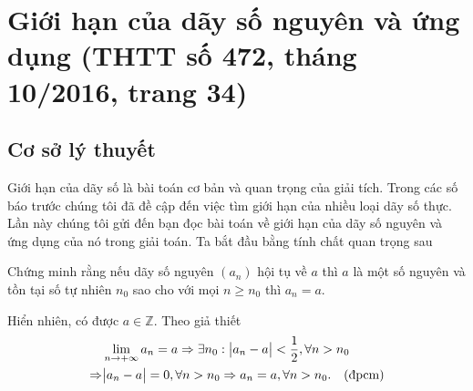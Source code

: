 \section{Giới hạn của dãy số nguyên và ứng dụng (THTT số 472, tháng 10/2016, trang 34)}
\begin{center}
	\textbf{\color{violet}{Kiều Đình Minh - Tạ Anh Dũng \\
			(GV THPT Chuyên Hùng Vương, Phú Thọ)}}
\end{center}
\subsection{Cơ sở lý thuyết}
\noindent Giới hạn của dãy số là bài toán cơ bản và quan trọng của giải tích. Trong các số báo trước chúng tôi đã đề cập đến việc tìm giới hạn của nhiều loại dãy số thực. Lần này chúng tôi gửi đến bạn đọc bài toán về giới hạn của dãy số nguyên và ứng dụng của nó trong giải toán. Ta bắt đầu bằng tính chất quan trọng sau
\begin{dl}
	Chứng minh rằng nếu dãy số nguyên $(a_n)$ hội tụ về $a$ thì $a$ là một số nguyên và tồn tại số tự nhiên $n_0$ sao cho với mọi $n \geq n_0$ thì  $a_n=a$.
\end{dl}
\begin{cm}
	Hiển nhiên, có được $a \in \mathbb{Z}$. Theo giả thiết
	\begin{displaymath}
		\begin{aligned}
			&\lim_{n \to +\infty} a_n=a \Rightarrow \exists n_0: \big{|} a_n-a \big{|}<\dfrac{1}{2},\forall n>n_0\\
			\Rightarrow &\big{|} a_n-a \big{|}=0,\forall n>n_0\Rightarrow a_n=a,\forall n>n_0.\quad \text{(đpcm)}
		\end{aligned}
	\end{displaymath}
\end{cm}
\medskip

